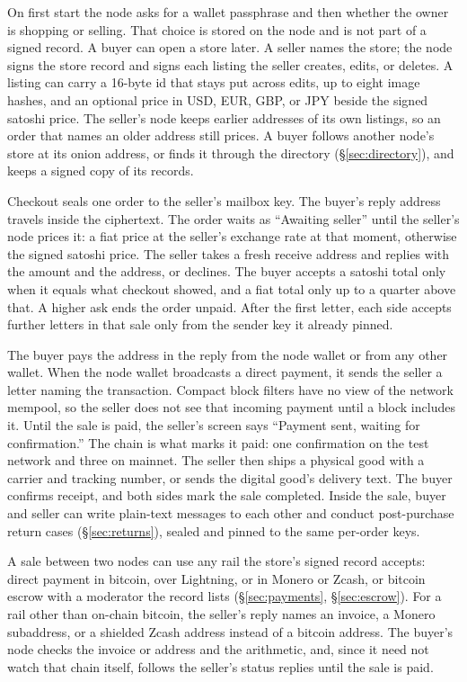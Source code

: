 On first start the node asks for a wallet passphrase and then whether the owner is shopping or selling. That choice is stored on the node and is not part of a signed record. A buyer can open a store later. A seller names the store; the node signs the store record and signs each listing the seller creates, edits, or deletes. A listing can carry a 16-byte id that stays put across edits, up to eight image hashes, and an optional price in USD, EUR, GBP, or JPY beside the signed satoshi price. The seller's node keeps earlier addresses of its own listings, so an order that names an older address still prices. A buyer follows another node's store at its onion address, or finds it through the directory (\S\ref{sec:directory}), and keeps a signed copy of its records.

Checkout seals one order to the seller's mailbox key. The buyer's reply address travels inside the ciphertext. The order waits as ``Awaiting seller'' until the seller's node prices it: a fiat price at the seller's exchange rate at that moment, otherwise the signed satoshi price. The seller takes a fresh receive address and replies with the amount and the address, or declines. The buyer accepts a satoshi total only when it equals what checkout showed, and a fiat total only up to a quarter above that. A higher ask ends the order unpaid. After the first letter, each side accepts further letters in that sale only from the sender key it already pinned.

The buyer pays the address in the reply from the node wallet or from any other wallet. When the node wallet broadcasts a direct payment, it sends the seller a letter naming the transaction. Compact block filters have no view of the network mempool, so the seller does not see that incoming payment until a block includes it. Until the sale is paid, the seller's screen says ``Payment sent, waiting for confirmation.'' The chain is what marks it paid: one confirmation on the test network and three on mainnet. The seller then ships a physical good with a carrier and tracking number, or sends the digital good's delivery text. The buyer confirms receipt, and both sides mark the sale completed. Inside the sale, buyer and seller can write plain-text messages to each other and conduct post-purchase return cases (\S\ref{sec:returns}), sealed and pinned to the same per-order keys.

A sale between two nodes can use any rail the store's signed record accepts: direct payment in bitcoin, over Lightning, or in Monero or Zcash, or bitcoin escrow with a moderator the record lists (\S\ref{sec:payments}, \S\ref{sec:escrow}). For a rail other than on-chain bitcoin, the seller's reply names an invoice, a Monero subaddress, or a shielded Zcash address instead of a bitcoin address. The buyer's node checks the invoice or address and the arithmetic, and, since it need not watch that chain itself, follows the seller's status replies until the sale is paid.

